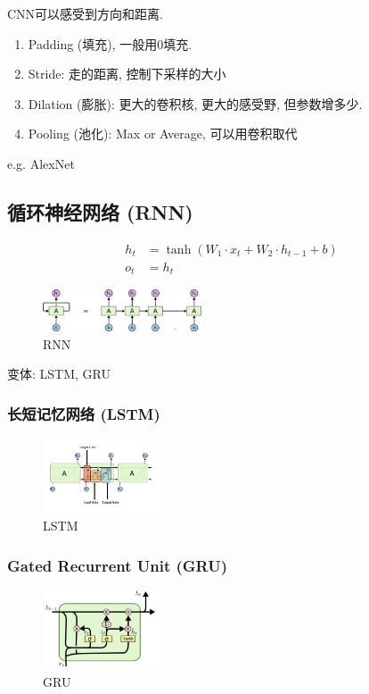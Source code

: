 CNN可以感受到方向和距离. 

\begin{enumerate}
    \item Padding (填充), 一般用0填充. 
    \item Stride: 走的距离, 控制下采样的大小
    \item Dilation (膨胀): 更大的卷积核, 更大的感受野, 但参数增多少. 
    \item Pooling (池化): Max or Average, 可以用卷积取代
\end{enumerate} 

e.g. AlexNet

\subsection{循环神经网络 (RNN)}
\begin{align*}
    h_t&=\tanh (W_1 \cdot x_t + W_2 \cdot h_{t-1} +b)\\
    o_t&=h_t
\end{align*}
\begin{figure}[!htb]
    \centering
    \includegraphics[width=0.42\textwidth]{pic/DL2/RNN}
    \caption{RNN}
\end{figure}

变体: LSTM, GRU

\subsubsection{长短记忆网络 (LSTM)}
\begin{figure}[!htb]
    \centering
    \includegraphics[width=0.309\textwidth]{pic/DL2/LSTM}
    \caption{LSTM}
\end{figure}


\subsubsection{Gated Recurrent Unit (GRU)}
\begin{figure}[!htb]
    \centering
    \includegraphics[width=0.309\textwidth]{pic/DL2/GRU}
    \caption{GRU}
\end{figure}



